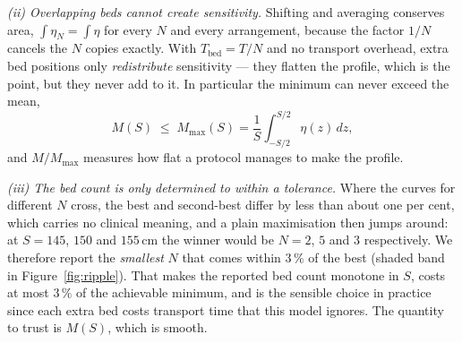 \documentclass[11pt,a4paper]{article}
\begin{document}
\emph{(ii) Overlapping beds cannot create sensitivity.} Shifting and averaging conserves
area, $\int\eta_N=\int\eta$ for every $N$ and every arrangement, because the factor $1/N$
cancels the $N$ copies exactly. With $T_{\mathrm{bed}}=T/N$ and no transport overhead, extra
bed positions only \emph{redistribute} sensitivity --- they flatten the profile, which is
the point, but they never add to it. In particular the minimum can never exceed the mean,
\begin{equation}
  M(S)\;\le\;M_{\max}(S)=\frac{1}{S}\int_{-S/2}^{S/2}\eta(z)\,dz ,
  \label{eq:ceiling}
\end{equation}
and $M/M_{\max}$ measures how flat a protocol manages to make the profile.

\emph{(iii) The bed count is only determined to within a tolerance.} Where the curves for
different $N$ cross, the best and second-best differ by less than about one per cent, which
carries no clinical meaning, and a plain maximisation then jumps around: at $S=145$, $150$
and $155\,\mathrm{cm}$ the winner would be $N=2$, $5$ and $3$ respectively. We therefore
report the \emph{smallest} $N$ that comes within $3\,\%$ of the best (shaded band in
Figure~\ref{fig:ripple}). That makes the reported bed count monotone in $S$, costs at most
$3\,\%$ of the achievable minimum, and is the sensible choice in practice since each extra
bed costs transport time that this model ignores. The quantity to trust is $M(S)$, which is
smooth.
\end{document}
